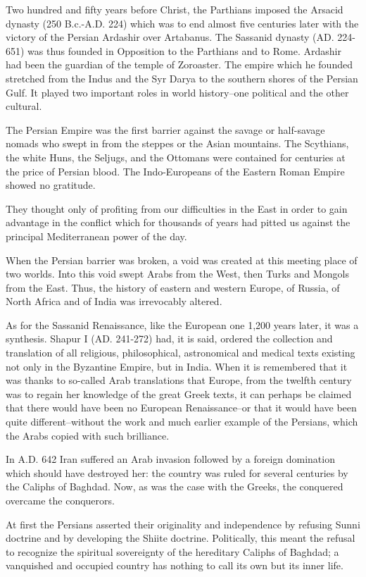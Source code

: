 Two hundred and fifty years before Christ, the Parthians imposed the Arsacid dynasty (250 B.c.-A.D. 224) which was to end almost five centuries later with the victory of the Persian Ardashir over Artabanus. The Sassanid dynasty (AD. 224-651) was thus founded in Opposition to the Parthians and to Rome. Ardashir had been the guardian of the temple of Zoroaster. The empire which he founded stretched from the Indus and the Syr Darya to the southern shores of the Persian Gulf. It played two important roles in world history--one political and the other cultural. 

The Persian Empire was the first barrier against the savage or half-savage nomads who swept in from the steppes or the Asian mountains. The Scythians, the white Huns, the Seljugs, and the Ottomans were contained for centuries at the price of Persian blood. The Indo-Europeans of the Eastern Roman Empire showed no gratitude. 

They thought only of profiting from our difficulties in the East in order to gain advantage in the conflict which for thousands of years had pitted us against the principal Mediterranean power of the day. 

When the Persian barrier was broken, a void was created at this meeting place of two worlds. Into this void swept Arabs from the West, then Turks and Mongols from the East. Thus, the history of eastern and western Europe, of Russia, of North Africa and of India was irrevocably altered. 

As for the Sassanid Renaissance, like the European one 1,200 years later, it was a synthesis. Shapur I (AD. 241-272) had, it is said, ordered the collection and translation of all religious, philosophical, astronomical and medical texts existing not only in the Byzantine Empire, but in India. When it is remembered that it was thanks to so-called Arab translations that Europe, from the twelfth century was to regain her knowledge of the great Greek texts, it can perhaps be claimed that there would have been no European Renaissance--or that it would have been quite different--without the work and much earlier example of the Persians, which the Arabs copied with such brilliance. 


In A.D. 642 Iran suffered an Arab invasion followed by a foreign domination which should have destroyed her: the country was ruled for several centuries by the Caliphs of Baghdad. Now, as was the case with the Greeks, the conquered overcame the conquerors. 

At first the Persians asserted their originality and independence by refusing Sunni doctrine and by developing the Shiite doctrine. Politically, this meant the refusal to recognize the spiritual sovereignty of the hereditary Caliphs of Baghdad; a vanquished and occupied country has nothing to call its own but its inner life. 

